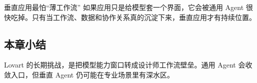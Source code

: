 \begin{warningbox}{垂直应用最怕“薄工作流”}
如果应用只是给模型套一个界面，它会被通用 Agent 很快吃掉。只有当工作流、数据和协作关系真的沉淀下来，垂直应用才有持续位置。
\end{warningbox}

\subsection{本章小结}

Lovart 的长期挑战，是把模型能力窗口转成设计师工作流壁垒。通用 Agent 会收敛入口，但垂直 Agent 仍可能在专业场景里有深水区。

